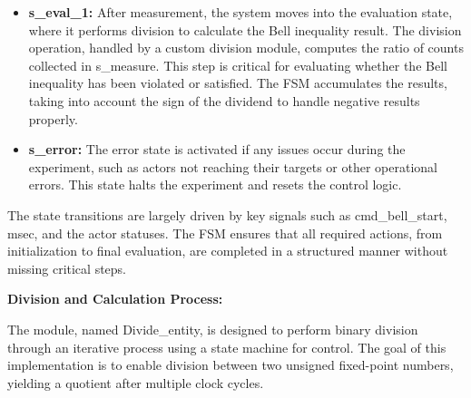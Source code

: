 \begin{itemize}
\item \textbf{s\_eval\_1: \newline}
After measurement, the system moves into the evaluation state, where it performs division to calculate the Bell inequality result. The division operation, handled by a custom division module, computes the ratio of counts collected in s\_measure. This step is critical for evaluating whether the Bell inequality has been violated or satisfied. The \acs{FSM} accumulates the results, taking into account the sign of the dividend to handle negative results properly.

\item \textbf{s\_error: \newline}
The error state is activated if any issues occur during the experiment, such as actors not reaching their targets or other operational errors. This state halts the experiment and resets the control logic.

\end{itemize}

The state transitions are largely driven by key signals such as cmd\_bell\_start, msec, and the actor statuses. The \acs{FSM} ensures that all required actions, from initialization to final evaluation, are completed in a structured manner without missing critical steps. 

\textbf{Division and Calculation Process:}

The module, named Divide\_entity, is designed to perform binary division through an iterative process using a state machine for control. The goal of this implementation is to enable division between two unsigned fixed-point numbers, yielding a quotient after multiple clock cycles.

